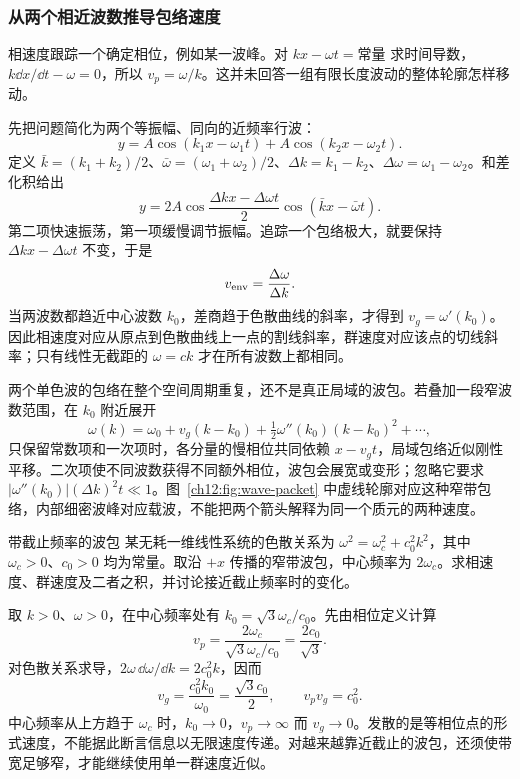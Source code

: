 \subsubsection{从两个相近波数推导包络速度}
相速度跟踪一个确定相位，例如某一波峰。对 $kx-\omega t=\text{常量}$ 求时间导数，$k\dd x/\dd t-\omega=0$，所以 $v_p=\omega/k$。这并未回答一组有限长度波动的整体轮廓怎样移动。

先把问题简化为两个等振幅、同向的近频率行波：
\[
 y=A\cos(k_1x-\omega_1t)+A\cos(k_2x-\omega_2t).
\]
定义 $\bar k=(k_1+k_2)/2$、$\bar\omega=(\omega_1+\omega_2)/2$、$\Delta k=k_1-k_2$、$\Delta\omega=\omega_1-\omega_2$。和差化积给出
\[
 y=2A\cos\frac{\Delta kx-\Delta\omega t}{2}
       \cos(\bar kx-\bar\omega t).
\]
第二项快速振荡，第一项缓慢调节振幅。追踪一个包络极大，就要保持 $\Delta kx-\Delta\omega t$ 不变，于是
\[
 v_{\rm env}=\frac{\Delta\omega}{\Delta k}.
\]
当两波数都趋近中心波数 $k_0$，差商趋于色散曲线的斜率，才得到 $v_g=\omega'(k_0)$。因此相速度对应从原点到色散曲线上一点的割线斜率，群速度对应该点的切线斜率；只有线性无截距的 $\omega=ck$ 才在所有波数上都相同。

两个单色波的包络在整个空间周期重复，还不是真正局域的波包。若叠加一段窄波数范围，在 $k_0$ 附近展开
\[
 \omega(k)=\omega_0+v_g(k-k_0)+\tfrac12\omega''(k_0)(k-k_0)^2+\cdots,
\]
只保留常数项和一次项时，各分量的慢相位共同依赖 $x-v_gt$，局域包络近似刚性平移。二次项使不同波数获得不同额外相位，波包会展宽或变形；忽略它要求 $|\omega''(k_0)|(\Delta k)^2t\ll1$。图~\ref{ch12:fig:wave-packet} 中虚线轮廓对应这种窄带包络，内部细密波峰对应载波，不能把两个箭头解释为同一个质元的两种速度。

\begin{origexamplebox}{带截止频率的波包}\label{ch12:ex:teaching-cutoff}
某无耗一维线性系统的色散关系为 $\omega^2=\omega_c^2+c_0^2k^2$，其中 $\omega_c>0$、$c_0>0$ 均为常量。取沿 $+x$ 传播的窄带波包，中心频率为 $2\omega_c$。求相速度、群速度及二者之积，并讨论接近截止频率时的变化。

\ThQCutoff
\end{origexamplebox}
\begin{xesolution}
\ThACutoff

取 $k>0$、$\omega>0$，在中心频率处有 $k_0=\sqrt3\omega_c/c_0$。先由相位定义计算
\[
 v_p=\frac{2\omega_c}{\sqrt3\omega_c/c_0}=\frac{2c_0}{\sqrt3}.
\]
对色散关系求导，$2\omega\,\dd\omega/\dd k=2c_0^2k$，因而
\[
 v_g=\frac{c_0^2k_0}{\omega_0}=\frac{\sqrt3c_0}{2},
 \qquad v_pv_g=c_0^2.
\]
中心频率从上方趋于 $\omega_c$ 时，$k_0\to0$，$v_p\to\infty$ 而 $v_g\to0$。发散的是等相位点的形式速度，不能据此断言信息以无限速度传递。对越来越靠近截止的波包，还须使带宽足够窄，才能继续使用单一群速度近似。
\end{xesolution}

